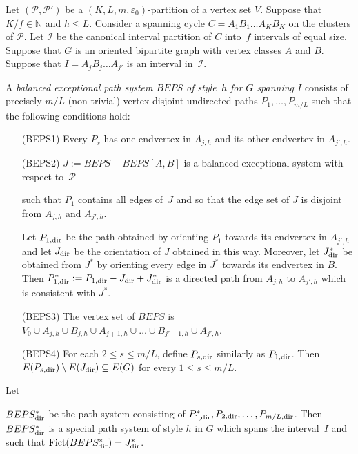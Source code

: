 \documentclass{memo-l}
\def\COMMENT#1{}
\def\cP{\mathcal{P}}
\def\eps{\varepsilon}
\def\epszero{\eps_0}
\numberwithin{section}{chapter}
\numberwithin{equation}{section}
\numberwithin{firstthm}{section}
\numberwithin{figure}{section}
\begin{document}
{Let $(\mathcal{P},\mathcal{P'})$ be a $(K,L,m, \epszero)$-partition of a vertex set $V$.
Suppose that $K/f\in\mathbb{N}$ and $h\le L$.
Consider a spanning cycle $C = A_1 B_1 \dots A_K B_K$ on the clusters of $\mathcal{P}$.
Let $\mathcal{I}$ be the canonical interval partition of $C$ into~$f$ intervals of equal size.
Suppose that $G$ is an oriented bipartite graph with vertex classes $A$ and $B$.
Suppose that $I=A_jB_j\dots A_{j'}$ is an interval in~$\mathcal{I}$.%
	\COMMENT{AL: changed line, Daniela added in~$\mathcal{I}$}
A \emph{balanced exceptional path system $BEPS$ of style~$h$ for $G$ spanning  $I$}
consists of precisely $m/L$ (non-trivial) vertex-disjoint undirected paths $P_1,\dots,P_{m/L}$ such that the following conditions hold:
\begin{enumerate}
\item[(BEPS1)] Every $P_s$ has one endvertex in $A_{j,h}$ and its other endvertex in $A_{j',h}$.
\item[(BEPS2)] $J := BEPS - BEPS[A,B]$ is a balanced exceptional system with respect to~$\cP$%
\COMMENT{AL: we cannot write 'There is a balanced exceptional system $J$\dots'. Because we want ALL balanced exceptional systems in BEPS to avoid $A_{j,h}$ and $A_{j',h}$.}
such that $P_1$ contains all edges of~$J$ and
so that the edge set of $J$ is disjoint from $A_{j,h}$ and $A_{j',h}$.%
    \COMMENT{Cannot just write $J\subseteq P_1$ since $J$ might contain vertices of degree 0 which don't belong to $P_1$.}
Let $P_{1,{\rm dir}}$ be the path obtained by orienting $P_1$ towards its endvertex in $A_{j',h}$
and let $J_{\rm dir}$ be the orientation of $J$ obtained in this way. Moreover, let $J^*_{\rm dir}$ be obtained from $J^*$ by orienting every edge in $J^*$
towards its endvertex in $B$. Then $P^*_{1,{\rm dir}}:=P_{1,{\rm dir}}-J_{\rm dir}+J^*_{\rm dir}$ is a directed path from $A_{j,h}$ to $A_{j',h}$ which is consistent with $J^*$.
\item[(BEPS3)] The vertex set of $BEPS$ is $V_0\cup A_{j,h}\cup B_{j,h}\cup A_{j+1,h}\cup \dots \cup B_{j'-1,h}\cup A_{j',h}$.
\item[(BEPS4)] For each $2\le s\le m/L$, define $P_{s,{\rm dir}}$ similarly as $P_{1,{\rm dir}}$.
Then $E(P_{s,{\rm dir}})\setminus E(J_{\rm dir}) \subseteq E(G)$ for every $1\le s\le m/L$.  
\end{enumerate}

Let%
    \COMMENT{Daniela deleted: Recall (BES2) that a balanced exceptional system does not contain $AB$-edges.
Since $G$ is bipartite, (BEPS2) and (BEPS4) implies that $J := BEPS - BEPS[A,B]$.} 
$BEPS^*_{\rm dir}$ be the path system consisting of $P^*_{1,{\rm dir}},P_{2,{\rm dir}},\dots,P_{m/L,{\rm dir}}$.
Then $BEPS^*_{\rm dir}$ is a special path system of style $h$ in $G$ which spans the interval~$I$ and such that ${\rm Fict}(BEPS^*_{\rm dir})=J^*_{\rm dir}$.

}
\end{document}
